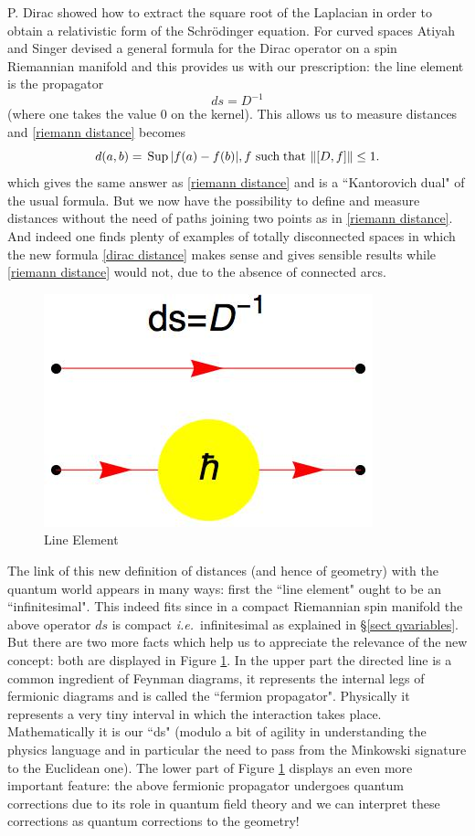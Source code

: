 \documentclass[12pt]{article}
\newcommand{\ie}{{\it i.e.\/}\ }
\begin{document}
P. Dirac showed how to extract the square root of the Laplacian in order to obtain a relativistic form of the Schr\"odinger equation. For curved spaces Atiyah and Singer devised a general formula for the Dirac operator on a spin Riemannian manifold and this provides us with our prescription: the line element is the propagator
$$
ds=D^{-1}
$$
(where one takes the value $0$ on the kernel). This allows us to measure distances and \eqref{riemann distance} becomes
\begin{equation}\label{dirac distance}
d(a,b)=\,{\rm Sup}\,\vert f(a)-f(b)\vert, f \ \text{such} \; \text{that}\ \Vert [D,f]\Vert\leq 1.
\end{equation}
which gives the same answer as \eqref{riemann distance} and is 
 a ``Kantorovich dual" of the usual formula. But we now have the possibility to define and measure distances without the need of paths joining two points as in \eqref{riemann distance}. And indeed one finds plenty of examples of totally disconnected spaces in which the new formula \eqref{dirac distance} makes sense and gives sensible results while \eqref{riemann distance} would not, due to the absence of connected arcs. 
\begin{figure}[H]
\begin{center}
\includegraphics[scale=0.4]{dressed23.jpg}
\end{center}
\caption{Line Element \label{line} }
\end{figure}
The link of this new definition of distances (and hence of geometry) with the quantum world appears in many ways: first the ``line element" ought to be an ``infinitesimal". This indeed fits  since in a compact Riemannian spin manifold the above operator $ds$  is compact \ie infinitesimal as explained in \S \ref{sect qvariables}. But there are two more facts which help us to appreciate the relevance of the new concept: both are displayed in Figure \ref{line}. In the upper part the directed line is a common ingredient of Feynman diagrams, it represents the internal legs of fermionic diagrams and is called the ``fermion propagator". Physically it represents a very tiny interval in which the interaction takes place. Mathematically it is our ``ds" (modulo a bit of agility in understanding the physics language  and in particular the need to pass from the Minkowski signature to the Euclidean one). The lower part of Figure \ref{line} displays an even more important feature: the above fermionic propagator undergoes quantum corrections due to its role in quantum field theory and we can interpret these corrections as quantum corrections to the geometry!
\end{document}
